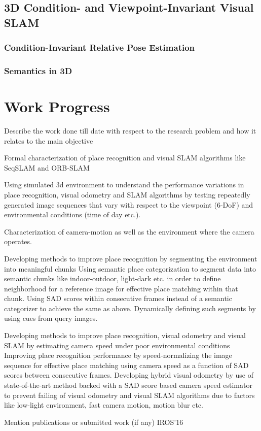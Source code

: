 \documentclass{article}
\begin{document}
\subsection{3D Condition- and Viewpoint-Invariant Visual SLAM}

\subsubsection{Condition-Invariant Relative Pose Estimation}
\subsubsection{Semantics in 3D}

\section{Work Progress}
\begin{outline}
 \1 Describe the work done till date with respect to the research problem and how it relates to the main objective
 
 
 \2 Formal characterization of place recognition and visual SLAM algorithms like SeqSLAM and ORB-SLAM
 
 \3 Using simulated 3d environment to understand the performance variations in place recognition, visual odometry and SLAM algorithms by testing repeatedly generated image sequences that vary with respect to the viewpoint (6-DoF) and environmental conditions (time of day etc.).
 
 
 \2 Characterization of camera-motion as well as the environment where the camera operates.
 
 \3 Developing methods to improve place recognition by segmenting the environment into meaningful chunks
 \4 Using semantic place categorization to segment data into semantic chunks like indoor-outdoor, light-dark etc. in order to define neighborhood for a reference image for effective place matching within that chunk.
 \4 Using SAD scores within consecutive frames instead of a semantic categorizer to achieve the same as above.
 \4 Dynamically defining such segments by using cues from query images.
 
 \3 Developing methods to improve place recognition, visual odometry and visual SLAM by estimating camera speed under poor environmental conditions
 \4 Improving place recognition performance by speed-normalizing the image sequence for effective place matching using camera speed as a function of SAD scores between consecutive frames.
 \4 Developing hybrid visual odometry by use of state-of-the-art method backed with a SAD score based camera speed estimator to prevent failing of visual odometry and visual SLAM algorithms due to factors like low-light environment, fast camera motion, motion blur etc.
 
 \1 Mention publications or submitted work (if any)
 \2 IROS'16
 
\end{outline}
\end{document}
